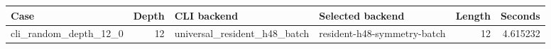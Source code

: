{\small
\begin{tabular}{lrllrr}
\hline
Case & Depth & CLI backend & Selected backend & Length & Seconds \\
\hline
cli\_random\_depth\_12\_0 & 12 & universal\_resident\_h48\_batch & resident-h48-symmetry-batch & 12 & 4.615232 \\
\hline
\end{tabular}
}
